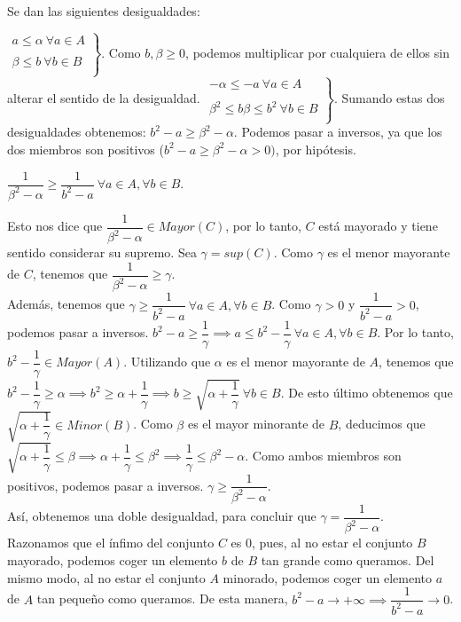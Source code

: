 \documentclass[10pt,a4paper]{article}
\begin{document}
	Se dan las siguientes desigualdades:
	
	$\left.\begin{array}{lcc}
		a \leq \alpha ~ \forall a \in A\\
		\\ \beta \leq b ~ \forall b \in B \\
	\end{array}\right\rbrace$. Como $b, \beta \geq 0$, podemos multiplicar por cualquiera de ellos sin alterar el sentido de la desigualdad. 
$	\left.\begin{array}{lcc}
		-\alpha \leq -a ~ \forall a \in A\\
		\\ \beta^2 \leq b\beta \leq b^2 ~ \forall b \in B \\
	\end{array}\right\rbrace$. Sumando estas dos desigualdades obtenemos: $b^2-a \geq \beta^2-\alpha$. Podemos pasar a inversos, ya que los dos miembros son positivos ($b^2-a \geq \beta^2-\alpha > 0)$, por hipótesis.

	$\dfrac{1}{\beta^2-\alpha} \geq \dfrac{1}{b^2-a} ~ \forall a \in A, \forall b \in B$.
	
	Esto nos dice que $\dfrac{1}{\beta^2-\alpha} \in Mayor(C)$, por lo tanto, $C$ está mayorado y tiene sentido considerar su supremo. Sea $\gamma = sup(C)$. Como $\gamma$ es el menor mayorante de $C$, tenemos que $\dfrac{1}{\beta^2-\alpha} \geq \gamma$. \\
	
	Además, tenemos que $\gamma \geq \dfrac{1}{b^2-a} ~ \forall a \in A, \forall b \in B$. Como $\gamma > 0$ y $\dfrac{1}{b^2-a} > 0$, podemos pasar a inversos. $b^2-a \geq \dfrac{1}{\gamma} \implies a \leq b^2- \dfrac{1}{\gamma} ~ \forall a \in A, \forall b \in B$. Por lo tanto, $b^2- \dfrac{1}{\gamma} \in Mayor(A)$. Utilizando que $\alpha$ es el menor mayorante de $A$, tenemos que $b^2 - \dfrac{1}{\gamma} \geq \alpha \implies b^2 \geq \alpha + \dfrac{1}{\gamma} \implies b \geq \sqrt{\alpha + \dfrac{1}{\gamma}} ~ \forall b \in B$. De esto último obtenemos que $\sqrt{\alpha + \dfrac{1}{\gamma}} \in Minor(B)$. Como $\beta$ es el mayor minorante de $B$, deducimos que $\sqrt{\alpha + \dfrac{1}{\gamma}} \leq \beta \implies \alpha + \dfrac{1}{\gamma} \leq \beta^2 \implies \dfrac{1}{\gamma} \leq \beta^2 - \alpha$. Como ambos miembros son positivos, podemos pasar a inversos. $\gamma \geq \dfrac{1}{\beta^2-\alpha}$. \\
	
	Así, obtenemos una doble desigualdad, para concluir que $\gamma = \dfrac{1}{\beta^2-\alpha}$. \\
	
	Razonamos que el ínfimo del conjunto $C$ es $0$, pues, al no estar el conjunto $B$ mayorado, podemos coger un elemento $b$ de $B$ tan grande como queramos. Del mismo modo, al no estar el conjunto $A$ minorado, podemos coger un elemento $a$ de $A$ tan pequeño como queramos. De esta manera, $ b^2-a \rightarrow +\infty \implies \dfrac{1}{b^2-a} \rightarrow 0$.
\end{document}
